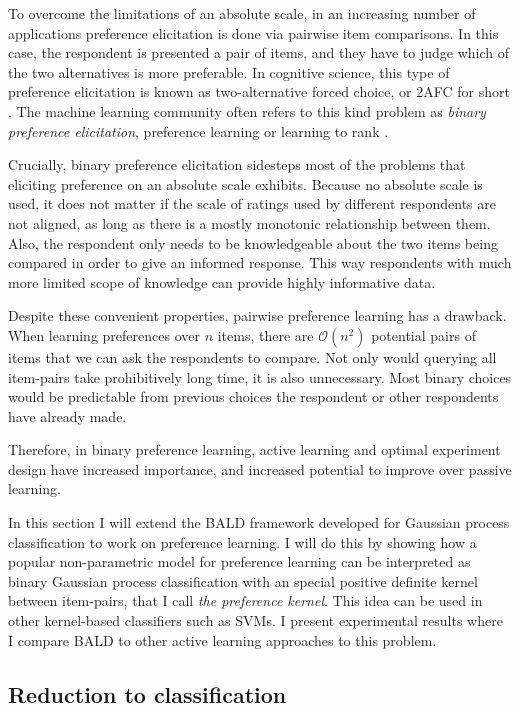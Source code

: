 To overcome the limitations of an absolute scale, in an increasing number of applications preference elicitation is done via pairwise item comparisons. In this case, the respondent is presented a pair of items, and they have to judge which of the two alternatives is more preferable. In cognitive science, this type of preference elicitation is known as two-alternative forced choice, or 2AFC for short \citep{Fechner1860,Platt1999,Huszar2010}. The machine learning community often refers to this kind problem as \emph{binary preference elicitation}, preference learning or learning to rank \citep{Chu2005,furnkranz2010}.

Crucially, binary preference elicitation sidesteps most of the problems that eliciting preference on an absolute scale exhibits. Because no absolute scale is used, it does not matter if the scale of ratings used by different respondents are not aligned, as long as there is a mostly monotonic relationship between them. Also, the respondent only needs to be knowledgeable about the two items being compared in order to give an informed response. This way respondents with much more limited scope of knowledge can provide highly informative data.

Despite these convenient properties, pairwise preference learning has a drawback. When learning preferences over $n$ items, there are $\mathcal{O}(n^2)$ potential pairs of items that we can ask the respondents to compare. Not only would querying all item-pairs take prohibitively long time, it is also unnecessary. Most binary choices would be predictable from previous choices the respondent or other respondents have already made.

Therefore, in binary preference learning, active learning and optimal experiment design have increased importance, and increased potential to improve over passive learning.

In this section I will extend the BALD framework developed for Gaussian process classification to work on preference learning. I will do this by showing how a popular non-parametric model for preference learning can be interpreted as binary Gaussian process classification with an special positive definite kernel between item-pairs, that I call \emph{the preference kernel}. This idea can be used in other kernel-based classifiers such as SVMs. I present experimental results where I compare BALD to other active learning approaches to this problem.

\subsection{Reduction to classification\label{sec:prefKernel}}

